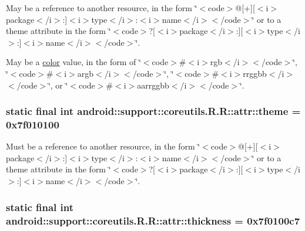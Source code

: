 May be a reference to another resource, in the form \char`\"{}$<$code$>$@\mbox{[}+\mbox{]}\mbox{[}$<$i$>$package$<$/i$>$:\mbox{]}$<$i$>$type$<$/i$>$:$<$i$>$name$<$/i$>$$<$/code$>$\char`\"{} or to a theme attribute in the form \char`\"{}$<$code$>$?\mbox{[}$<$i$>$package$<$/i$>$:\mbox{]}\mbox{[}$<$i$>$type$<$/i$>$:\mbox{]}$<$i$>$name$<$/i$>$$<$/code$>$\char`\"{}. 

May be a \hyperlink{classandroid_1_1support_1_1coreutils_1_1_r_1_1color}{color} value, in the form of \char`\"{}$<$code$>$\#$<$i$>$rgb$<$/i$>$$<$/code$>$\char`\"{}, \char`\"{}$<$code$>$\#$<$i$>$argb$<$/i$>$$<$/code$>$\char`\"{}, \char`\"{}$<$code$>$\#$<$i$>$rrggbb$<$/i$>$$<$/code$>$\char`\"{}, or \char`\"{}$<$code$>$\#$<$i$>$aarrggbb$<$/i$>$$<$/code$>$\char`\"{}. \hypertarget{classandroid_1_1support_1_1coreutils_1_1_r_1_1attr_9769e0a8579af4be81f6be24f2a340ea}{
\subsubsection[{theme}]{\setlength{\rightskip}{0pt plus 5cm}static final int android::support::coreutils.R.R::attr::theme = 0x7f010100}}
\label{classandroid_1_1support_1_1coreutils_1_1_r_1_1attr_9769e0a8579af4be81f6be24f2a340ea}


Must be a reference to another resource, in the form \char`\"{}$<$code$>$@\mbox{[}+\mbox{]}\mbox{[}$<$i$>$package$<$/i$>$:\mbox{]}$<$i$>$type$<$/i$>$:$<$i$>$name$<$/i$>$$<$/code$>$\char`\"{} or to a theme attribute in the form \char`\"{}$<$code$>$?\mbox{[}$<$i$>$package$<$/i$>$:\mbox{]}\mbox{[}$<$i$>$type$<$/i$>$:\mbox{]}$<$i$>$name$<$/i$>$$<$/code$>$\char`\"{}. \hypertarget{classandroid_1_1support_1_1coreutils_1_1_r_1_1attr_dffc42c13c05f9d6f92c261678e5342b}{
\subsubsection[{thickness}]{\setlength{\rightskip}{0pt plus 5cm}static final int android::support::coreutils.R.R::attr::thickness = 0x7f0100c7}}
\label{classandroid_1_1support_1_1coreutils_1_1_r_1_1attr_dffc42c13c05f9d6f92c261678e5342b}


